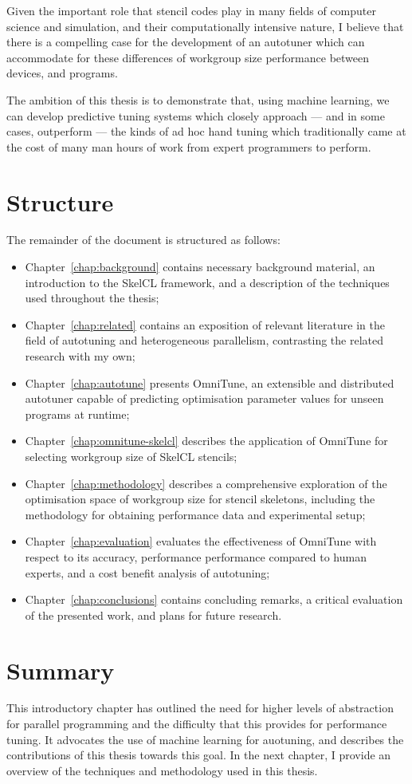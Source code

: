 Given the important role that stencil codes play in many fields of
computer science and simulation, and their computationally intensive
nature, I believe that there is a compelling case for the development
of an autotuner which can accommodate for these differences of
workgroup size performance between devices, and programs.

The ambition of this thesis is to demonstrate that, using machine
learning, we can develop predictive tuning systems which closely
approach --- and in some cases, outperform --- the kinds of ad hoc
hand tuning which traditionally came at the cost of many man hours of
work from expert programmers to perform.


\section{Structure}

The remainder of the document is structured as follows:

\begin{itemize}
\item Chapter~\ref{chap:background} contains necessary background
  material, an introduction to the SkelCL framework, and a description
  of the techniques used throughout the thesis;
\item Chapter~\ref{chap:related} contains an exposition of relevant
  literature in the field of autotuning and heterogeneous parallelism,
  contrasting the related research with my own;
\item Chapter~\ref{chap:autotune} presents OmniTune, an extensible and
  distributed autotuner capable of predicting optimisation parameter
  values for unseen programs at runtime;
\item Chapter~\ref{chap:omnitune-skelcl} describes the application of
  OmniTune for selecting workgroup size of SkelCL stencils;
\item Chapter~\ref{chap:methodology} describes a comprehensive
  exploration of the optimisation space of workgroup size for stencil
  skeletons, including the methodology for obtaining performance data
  and experimental setup;
\item Chapter~\ref{chap:evaluation} evaluates the effectiveness of
  OmniTune with respect to its accuracy, performance performance
  compared to human experts, and a cost benefit analysis of
  autotuning;
\item Chapter~\ref{chap:conclusions} contains concluding remarks, a
  critical evaluation of the presented work, and plans for future
  research.
\end{itemize}


\section{Summary}

This introductory chapter has outlined the need for higher levels of
abstraction for parallel programming and the difficulty that this
provides for performance tuning. It advocates the use of machine
learning for auotuning, and describes the contributions of this thesis
towards this goal. In the next chapter, I provide an overview of the
techniques and methodology used in this thesis.
